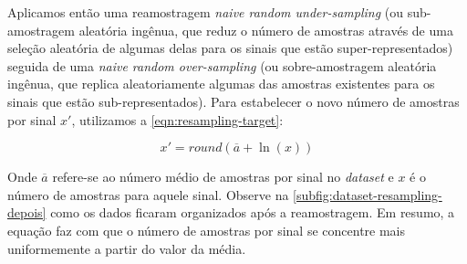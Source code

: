 Aplicamos então uma reamostragem \textit{naive random under-sampling} (ou sub-amostragem aleatória ingênua, que reduz o número de amostras através de uma seleção aleatória de algumas delas para os sinais que estão super-representados) seguida de uma \textit{naive random over-sampling} (ou sobre-amostragem aleatória ingênua, que replica aleatoriamente algumas das amostras existentes para os sinais que estão sub-representados).
Para estabelecer o novo número de amostras por sinal \(x'\), utilizamos a \autoref{eqn:resampling-target}: 

\begin{equation}
    \label{eqn:resampling-target}
    x' = round( \overline{a} + \ln(x) )
\end{equation}

Onde \(\overline{a}\) refere-se ao número médio de amostras por sinal no \textit{dataset} e \(x\) é o número de amostras para aquele sinal. Observe na \autoref{subfig:dataset-resampling-depois} como os dados ficaram organizados após a reamostragem. Em resumo, a equação faz com que o número de amostras por sinal se concentre mais uniformemente a partir do valor da média.
